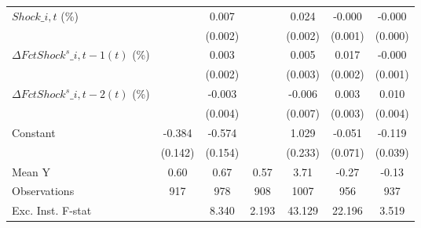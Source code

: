 {\begin{tabular}{l*{6}{c}}
\addlinespace
$ Shock\_{i,t}$ (\%) &                     &       0.007\sym{***}&                     &       0.024\sym{***}&      -0.000         &      -0.000         \\
                    &                     &     (0.002)         &                     &     (0.002)         &     (0.001)         &     (0.000)         \\
\addlinespace
$ \Delta FctShock^s\_{i,t-1}(t)$ (\%)&                     &       0.003         &                     &       0.005\sym{*}  &       0.017\sym{***}&      -0.000         \\
                    &                     &     (0.002)         &                     &     (0.003)         &     (0.002)         &     (0.001)         \\
\addlinespace
$ \Delta FctShock^s\_{i,t-2}(t)$ (\%)&                     &      -0.003         &                     &      -0.006         &       0.003         &       0.010\sym{**} \\
                    &                     &     (0.004)         &                     &     (0.007)         &     (0.003)         &     (0.004)         \\
\addlinespace
Constant            &      -0.384\sym{***}&      -0.574\sym{***}&                     &       1.029\sym{***}&      -0.051         &      -0.119\sym{***}\\
                    &     (0.142)         &     (0.154)         &                     &     (0.233)         &     (0.071)         &     (0.039)         \\
\midrule
Mean Y              &        0.60         &        0.67         &        0.57         &        3.71         &       -0.27         &       -0.13         \\
Observations        &         917         &         978         &         908         &        1007         &         956         &         937         \\
Exc. Inst. F-stat   &                     &       8.340         &       2.193         &      43.129         &      22.196         &       3.519         \\
\bottomrule
\end{tabular}
}

